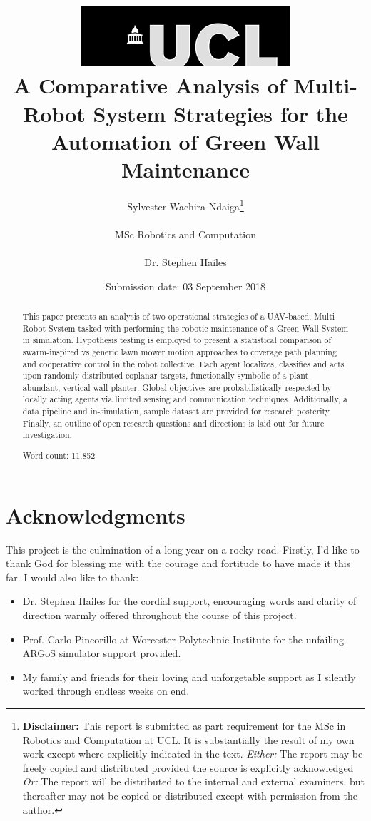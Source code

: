 \documentclass{report}
\title{  	{ \includegraphics[scale=.5]{ucl_logo.png} }\\
{{\Huge A Comparative Analysis of Multi-Robot System Strategies for the Automation of Green Wall Maintenance} }\\
	  }
\date{Submission date: 03 September 2018}
\author{Sylvester Wachira Ndaiga\thanks{
{\bf Disclaimer:}
This report is submitted as part requirement for the MSc in Robotics and Computation at UCL. It is
substantially the result of my own work except where explicitly indicated in the text.
\emph{Either:} The report may be freely copied and distributed provided the source is explicitly acknowledged
\newline  %
\emph{Or:}\newline
The report will be distributed to the internal and external examiners, but thereafter may not be copied or distributed except with permission from the author.}
\\ \\
MSc Robotics and Computation\\ \\
Dr. Stephen Hailes}
\begin{document}
 
\onehalfspacing
\maketitle
\begin{abstract}

This paper presents an analysis of two operational strategies of a UAV-based, Multi Robot System tasked with performing the robotic maintenance of a Green Wall System in simulation. Hypothesis testing is employed to present a statistical comparison of swarm-inspired vs generic lawn mower motion approaches to coverage path planning and cooperative control in the robot collective. Each agent localizes, classifies and acts upon randomly distributed coplanar targets, functionally symbolic of a plant-abundant, vertical wall planter. Global objectives are probabilistically respected by locally acting agents via limited sensing and communication techniques. Additionally, a data pipeline and in-simulation, sample dataset are provided for research posterity. Finally, an outline of open research questions and directions is laid out for future investigation.

\vspace*{\fill}
\centering
Word count: 11,852
\vspace*{\fill}

\end{abstract}
\tableofcontents
\setcounter{page}{1}

\newpage
\section*{Acknowledgments}
This project is the culmination of a long year on a rocky road. Firstly, I'd like to thank God for blessing me with the courage and fortitude to have made it this far. I would also like to thank:

\begin{itemize}	
	\item Dr. Stephen Hailes for the cordial support, encouraging words and clarity of direction warmly offered throughout the course of this project.
	\item Prof. Carlo Pincorillo at Worcester Polytechnic Institute for the unfailing ARGoS simulator support provided.
	\item My family and friends for their loving and unforgetable support as I silently worked through endless weeks on end.
\end{itemize}
\end{document}
